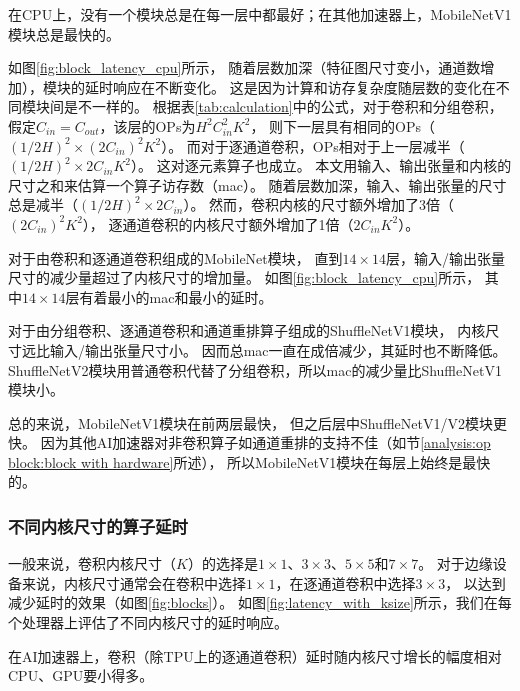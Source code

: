 \begin{finding}
    在CPU上，没有一个模块总是在每一层中都最好；在其他加速器上，MobileNetV1模块总是最快的。
\end{finding}

如图\ref{fig:block_latency_cpu}所示，
随着层数加深（特征图尺寸变小，通道数增加），模块的延时响应在不断变化。
这是因为计算和访存复杂度随层数的变化在不同模块间是不一样的。
根据表\ref{tab:calculation}中的公式，对于卷积和分组卷积，
假定$C_{in}=C_{out}$，该层的OPs为$H^2C_{in}^2K^2$，
则下一层具有相同的OPs（$(1/2H)^2\times (2C_{in})^2K^2$）。
而对于逐通道卷积，OPs相对于上一层减半（$(1/2H)^2\times 2C_{in}K^2$）。
这对逐元素算子也成立。
本文用输入、输出张量和内核的尺寸之和来估算一个算子访存数（mac）。
随着层数加深，输入、输出张量的尺寸总是减半（$(1/2H)^2\times 2C_{in}$）。
然而，卷积内核的尺寸额外增加了3倍（$(2 C_{in})^2K^2$），
逐通道卷积的内核尺寸额外增加了1倍（$2 C_{in}K^2$）。

对于由卷积和逐通道卷积组成的MobileNet模块，
直到$14\times 14$层，输入/输出张量尺寸的减少量超过了内核尺寸的增加量。
如图\ref{fig:block_latency_cpu}所示，
其中$14\times 14$层有着最小的mac和最小的延时。

对于由分组卷积、逐通道卷积和通道重排算子组成的ShuffleNetV1模块，
内核尺寸远比输入/输出张量尺寸小。
因而总mac一直在成倍减少，其延时也不断降低。
ShuffleNetV2模块用普通卷积代替了分组卷积，所以mac的减少量比ShuffleNetV1模块小。

总的来说，MobileNetV1模块在前两层最快，
但之后层中ShuffleNetV1/V2模块更快。
因为其他AI加速器对非卷积算子如通道重排的支持不佳（如节\ref{analysis:op block:block with hardware}所述），
所以MobileNetV1模块在每层上始终是最快的。

\subsubsection{不同内核尺寸的算子延时}
\label{analysis:op block:op with ksize}


一般来说，卷积内核尺寸（$K$）的选择是$1\times 1$、$3\times 3$、$5\times 5$和$7\times 7$。
对于边缘设备来说，内核尺寸通常会在卷积中选择$1\times 1$，在逐通道卷积中选择$3\times 3$，
以达到减少延时的效果（如图\ref{fig:blocks}）。
如图\ref{fig:latency_with_ksize}所示，我们在每个处理器上评估了不同内核尺寸的延时响应。

\begin{finding}
    在AI加速器上，卷积（除TPU上的逐通道卷积）延时随内核尺寸增长的幅度相对CPU、GPU要小得多。
\end{finding}

